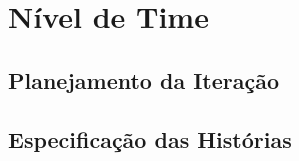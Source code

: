 \chapter[Nível de Time]{Nível de Time}

\section{Planejamento da Iteração}

\section{Especificação das Histórias}

